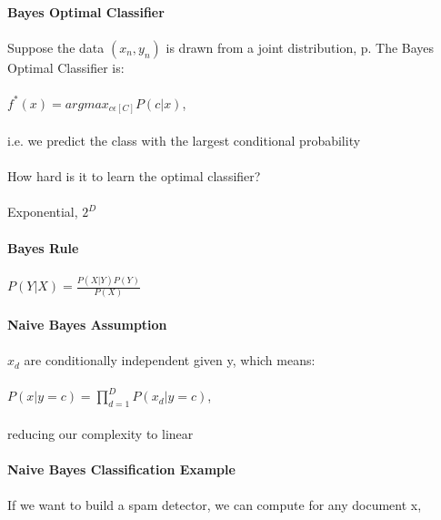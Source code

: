\documentclass{article}
\begin{document}
\paragraph{Bayes Optimal Classifier}
\paragraph{}
Suppose the data \((x_n, y_n)\) is drawn from a joint distribution, p. The Bayes Optimal Classifier is:
\paragraph{}
\(f^*(x) = argmax_{c\epsilon[C]}P(c|x)\),\\\\
i.e. we predict the class with the largest conditional probability\\\\
How hard is it to learn the optimal classifier?\\\\
Exponential, \(2^D\)
\paragraph{Bayes Rule}
\paragraph{}
\(P(Y|X)=\frac{P(X|Y)P(Y)}{P(X)}\)
\paragraph{Naive Bayes Assumption}
\paragraph{}
\(x_d\) are conditionally independent given y, which means:
\paragraph{}
\(P(x|y=c)=\prod_{d=1}^D P(x_d|y=c)\),\\\\
reducing our complexity to linear
\paragraph{Naive Bayes Classification Example}
\paragraph{}
If we want to build a spam detector, we can compute for any document x,
\end{document}
